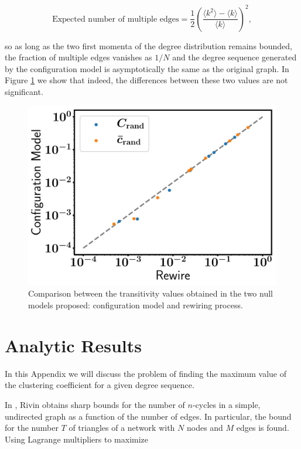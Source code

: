 \documentclass{article}
\begin{document}
\begin{equation}
\text{Expected number of multiple edges} = \dfrac{1}{2}  \left( \dfrac{\langle k^2 \rangle - \langle k \rangle}{\langle k \rangle}\right)^2,
\end{equation}

 so as long as the two first momenta of the degree distribution remains bounded, the fraction of multiple edges vanishes as $1/N$ and the degree sequence generated by the configuration model is asymptotically the same as the original graph. In Figure \ref{fig:CrandCM_vs_CrandRewire} we show that indeed, the differences between these two values are not significant.

\begin{figure}[ht!]
\centering
\includegraphics[scale=0.35]{./figs/CrandCM_vs_CrandRewire.pdf}
\caption{Comparison between the transitivity values obtained in the two null models proposed: configuration model and rewiring process.}
\label{fig:CrandCM_vs_CrandRewire}
\end{figure}

\section{Analytic Results}

In this Appendix we will discuss the problem of finding the maximum value of the clustering coefficient for a given degree sequence.

In \cite{Rivin2002}, Rivin obtains sharp bounds for the number of $n$-cycles in a simple, undirected graph as a function of the number of edges. In particular, the bound for the number $T$ of triangles of a network with $N$ nodes and $M$ edges is found. Using Lagrange multipliers to maximize 
\end{document}
